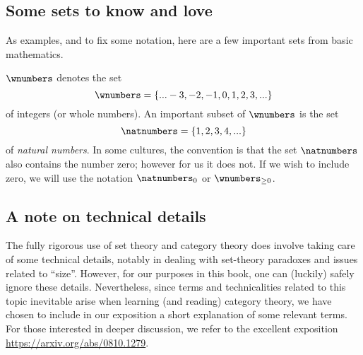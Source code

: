 \subsection{Some sets to know and love}

As examples, and to fix some notation, here are a few important sets from basic mathematics.

$\wnumbers$ denotes the set
\begin{equation}
\wnumbers = \{... -3, -2, -1, 0, 1, 2, 3, ... \}
\end{equation}
of integers (or whole numbers). An important subset of $\wnumbers$ is the set
\begin{equation}
\natnumbers = \{1, 2, 3, 4, ... \}
\end{equation}
of \emph{natural numbers}. In some cultures, the convention is that the set $\natnumbers$ also contains the number zero; however for us it does not. If we wish to include zero, we will use the notation $\natnumbers_0$ or $\wnumbers_{\geq 0}$.







\subsection{A note on technical details}

The fully rigorous use of set theory and category theory does involve taking care of some technical details, notably in dealing with set-theory paradoxes and issues related to ``size''.
However, for our purposes in this book, one can (luckily) safely ignore these details.
Nevertheless, since terms and technicalities related to this topic inevitable arise when learning (and reading) category theory, we have chosen to include in our exposition a short explanation of some relevant terms.
For those interested in deeper discussion, we refer to the excellent exposition \url{https://arxiv.org/abs/0810.1279}.


